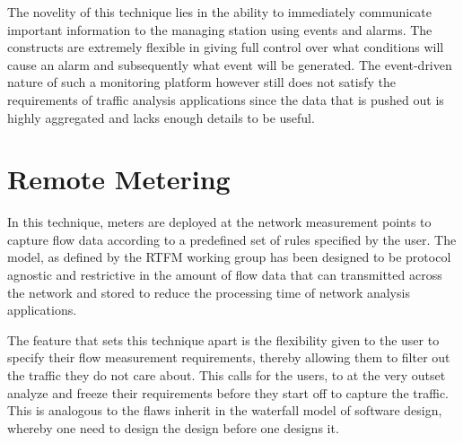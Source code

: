 The novelity of this technique lies in the ability to immediately communicate important information to the managing station using events and alarms. The constructs are extremely flexible in giving full control over what conditions will cause an alarm  and subsequently what event will be generated. The event-driven nature of such a monitoring platform however still does not satisfy the requirements of traffic analysis applications since the data that is pushed out is highly aggregated and lacks enough details to be useful. 

\section{Remote Metering}\label{sec:remote-metering}
In this technique, meters are deployed at the network measurement points to capture flow data according to a predefined set of rules specified by the user. The model, as defined by the \ac{RTFM} working group \cite{rfc2722} has been designed to be protocol agnostic and restrictive in the amount of flow data that can transmitted across the network and stored to reduce the processing time of network analysis applications. 

The feature that sets this technique apart is the flexibility given to the user to specify their flow measurement requirements, thereby allowing them to filter out the traffic they do not care about. This calls for the users, to at the very outset analyze  and freeze their requirements before they start off to capture the traffic. This is analogous to the flaws inherit in the waterfall model \cite{wroyce:1987} of software design, whereby one need to design the design before one designs it.